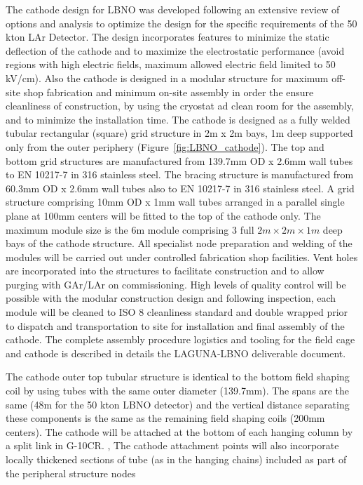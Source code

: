 The cathode design for LBNO was developed following an extensive review of options and analysis to optimize the design for the specific requirements of the 50 kton LAr Detector.  The design incorporates features to minimize the static deflection of the cathode and to maximize the electrostatic performance (avoid regions with high electric fields, maximum allowed electric field limited to 50 kV/cm). Also the cathode is designed in a modular structure for maximum off-site shop fabrication and minimum on-site assembly in order the ensure cleanliness of construction, by using the cryostat ad clean room for the assembly, and to minimize the installation time. The cathode is designed as a fully welded tubular rectangular (square) grid structure in 2m x 2m bays, 1m deep supported only from the outer periphery (Figure~\ref{fig:LBNO_cathode}).  The top and bottom grid structures are manufactured from 139.7mm OD x 2.6mm wall tubes to EN 10217-7 in 316 stainless steel.  The bracing structure is manufactured from 60.3mm OD x 2.6mm wall tubes also to EN 10217-7 in 316 stainless steel.  A grid structure comprising 10mm OD x 1mm wall tubes arranged in a parallel single plane at 100mm centers will be fitted to the top of the cathode only. The maximum module size is the 6m module comprising 3 full $2m \times 2m \times 1m$ deep bays of the cathode structure.  All specialist node preparation and welding of the modules will be carried out under controlled fabrication shop facilities.  Vent holes are incorporated into the structures to facilitate construction and to allow purging with GAr/LAr on commissioning. High levels of quality control will be possible with the modular construction design and following inspection, each module will be cleaned to ISO 8 cleanliness standard and double wrapped prior to dispatch and transportation to site for installation and final assembly of the cathode. The complete assembly procedure logistics and tooling for the field cage and cathode is described in details the LAGUNA-LBNO deliverable document.

The cathode outer top tubular structure is identical to the bottom field shaping coil  by using tubes with  the same outer diameter (139.7mm).  The spans are the same (48m for the 50 kton LBNO detector) and the vertical distance separating these components is the same as the remaining field shaping coils (200mm centers). The cathode will be attached at the bottom of each hanging column by a split link in G-10CR. , The cathode attachment points will also incorporate locally thickened sections of tube (as in the hanging chains) included as part of the peripheral structure nodes


